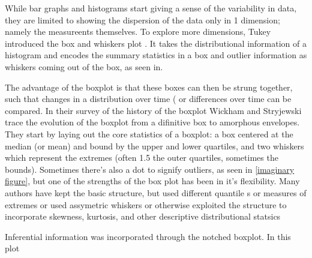 While bar graphs and histograms start giving a sense of the variability in
data, they are limited to showing the dispersion of the data only in 1
dimension; namely the measureents themselves. To explore more dimensions,
Tukey introduced the box and whiskers plot \cite{Tukey1970, Tukey1977}. It
takes the distributional information of a histogram and encodes the summary
statistics in a box and outlier information as whiskers coming out of the box,
as seen in. %


The advantage of the boxplot is that these boxes can then be strung together,
such that changes in a distribution over time (%
or differences over time can be compared. In their survey of the history of the
boxplot \cite{Wickham2011} Wickham and Stryjewski trace the evolution of the
boxplot from a difinitive box to amorphous envelopes.  They start by laying out
the core statistics of a boxplot: a box centered at the median (or mean) and
bound by the upper and lower quartiles, and two whiskers which represent the extremes
(often 1.5 the outer quartiles, sometimes the \alpha bounds). Sometimes there's
also a dot to signify outliers, as seen in \ref{imaginary figure}, but one of
the strengths of the box plot has been in it's flexibility. Many authors have
kept the basic structure, but used different quantile \cite{Hyndman}s or
measures of extremes \cite{Frigge, carter} or used assymetric whiskers \cite{Rousseuw}
or otherwise exploited the structure to incorporate skewness, kurtosis, and
other descriptive distributional statsics \cite{ Aslam, choon, Marmelejo}






Inferential information was incorporated through the notched boxplot. \cite{McGill} %
In this plot 









